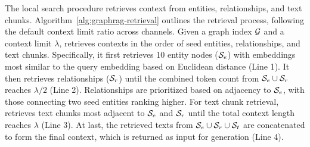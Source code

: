 The local search procedure retrieves context from entities, relationships, and text chunks. Algorithm~\ref{alg:graphrag-retrieval} outlines the retrieval process, following the default context limit ratio across channels.  
Given a graph index $\mathcal{G}$ and a context limit $\lambda$, \graphretrieval retrieves contexts in the order of seed entities, relationships, and text chunks. Specifically, it first retrieves 10 entity nodes ($\mathcal{S}_e$) with embeddings most similar to the query embedding based on Euclidean distance (Line 1).  It then retrieves relationships ($\mathcal{S}_r$) until the combined token count from $\mathcal{S}_e\cup \mathcal{S}_r$ reaches $\lambda/2$ (Line 2). Relationships are prioritized based on adjacency to $\mathcal{S}_e$, with those connecting two seed entities ranking higher.  
For text chunk retrieval, \graphretrieval retrieves text chunks most adjacent to $\mathcal{S}_e$ and $\mathcal{S}_r$ until the total context length reaches $\lambda$ (Line 3). At last, the retrieved texts from $\mathcal{S}_e \cup \mathcal{S}_r \cup \mathcal{S}_t$ are concatenated to form the final context, which is returned as input for generation (Line 4).


